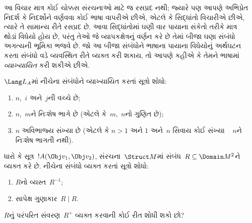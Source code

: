 \begin{explain}
આ વિચાર માત્ર કોઈ ચોક્કસ સંરચનાઓ માટે જ રસપ્રદ નથી; જ્યારે પણ
આપણે અભિપ્રેત નિદર્શ કે નિદર્શોને વર્ણવવા કોઈ ભાષા વાપરીએ છીએ, એટલે
કે સિદ્ધાંતો વિચારીએ છીએ, ત્યારે તે સામાન્ય રીતે રસપ્રદ છે. આવા
સિદ્ધાંતોમાં ઘણી વાર પાયાના સંકેતો તરીકે માત્ર થોડાં વિધેયો
હોય છે, પરંતુ તેઓ જે વ્યાપકક્ષેત્રનું વર્ણન કરે છે તેમાં બીજા ઘણા
સંબંધો અગત્યની ભૂમિકા ભજવે છે. જો આ બીજા સંબંધોને ભાષાના પાયાના
વિધેયોનું અર્થઘટન કરતા સંબંધો વડે વ્યવસ્થિત રીતે વ્યક્ત કરી
શકાય, તો આપણે કહીએ કે તેમને ભાષામાં \emph{વ્યાખ્યાયિત} કરી શકીએ છીએ.
\end{explain}

\begin{prob}
$\Lang L_A$માં નીચેના સંબંધોને વ્યાખ્યાયિત કરતાં સૂત્રો શોધો:
\begin{enumerate}
\item $n$,~$i$ અને~$j$ની વચ્ચે છે;
\item $n$,~$m$ને નિઃશેષ ભાગે છે (એટલે કે~$m$,~$n$નો ગુણિત છે);
\item $n$ અવિભાજ્ય સંખ્યા છે (એટલે કે $n>1$ અને $1$ અને~$n$ સિવાય કોઈ સંખ્યા
  ~ $n$ને નિઃશેષ ભાગતી નથી).
\end{enumerate}
\end{prob}


\begin{prob}
ધારો કે સૂત્ર~$!A(\Obj v_1,\Obj v_2)$, સંરચના~$\Struct M$માં
સંબંધ~$R\subseteq\Domain M^2$ને વ્યક્ત કરે છે. નીચેના સંબંધો વ્યક્ત
કરતાં સૂત્રો શોધો:
\begin{enumerate}
\item $R$નો વ્યસ્ત~$R^{-1}$;
\item સાપેક્ષ ગુણાકાર~$R\mid R$.
\end{enumerate}
$R$નું પરંપરિત સંવરણ~$R^+$ વ્યક્ત કરવાની કોઈ રીત શોધી શકો છો?
\end{prob}

